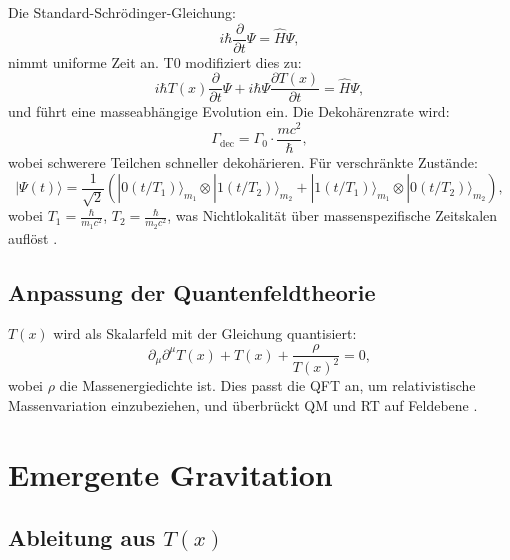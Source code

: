\documentclass[12pt,a4paper]{article}
\newcommand{\Tfield}{T(x)}
\begin{document}
	Die Standard-Schrödinger-Gleichung:
	\begin{equation}
		i\hbar \frac{\partial}{\partial t} \Psi = \hat{H} \Psi,
		\label{eq:standard_schrodinger}
	\end{equation}
	nimmt uniforme Zeit an. T0 modifiziert dies zu:
	\begin{equation}
		i\hbar \Tfield \frac{\partial}{\partial t} \Psi + i\hbar \Psi \frac{\partial \Tfield}{\partial t} = \hat{H} \Psi,
		\label{eq:modified_schrodinger}
	\end{equation}
	und führt eine masseabhängige Evolution ein. Die Dekohärenzrate wird:
	\begin{equation}
		\Gamma_{\text{dec}} = \Gamma_0 \cdot \frac{m c^2}{\hbar},
		\label{eq:decoherence}
	\end{equation}
	wobei schwerere Teilchen schneller dekohärieren. Für verschränkte Zustände:
	\begin{equation}
		|\Psi(t)\rangle = \frac{1}{\sqrt{2}}(|0(t/T_1)\rangle_{m_1} \otimes |1(t/T_2)\rangle_{m_2} + |1(t/T_1)\rangle_{m_1} \otimes |0(t/T_2)\rangle_{m_2}),
		\label{eq:entangled_state}
	\end{equation}
	wobei \(T_1 = \frac{\hbar}{m_1 c^2}\), \(T_2 = \frac{\hbar}{m_2 c^2}\), was Nichtlokalität über massenspezifische Zeitskalen auflöst \cite{pascher_photons_2025}.
	
	\subsection{Anpassung der Quantenfeldtheorie}
	\label{subsec:qft_extension}
	
	\(\Tfield\) wird als Skalarfeld mit der Gleichung quantisiert:
	\begin{equation}
		\partial_{\mu}\partial^{\mu}\Tfield + \Tfield + \frac{\rho}{\Tfield^2} = 0,
		\label{eq:field_eq}
	\end{equation}
	wobei \(\rho\) die Massenergiedichte ist. Dies passt die QFT an, um relativistische Massenvariation einzubeziehen, und überbrückt QM und RT auf Feldebene \cite{pascher_lagrange_2025}.
	
	\section{Emergente Gravitation}
	\label{sec:emergent_grav}
	
	\subsection{Ableitung aus \(\Tfield\)}
	\label{subsec:grav_derivation}
	
\end{document}
